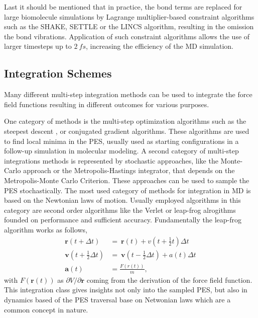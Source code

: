 Last it should be mentioned that in practice, the bond terms are replaced for large biomolecule simulations by Lagrange multiplier-based constraint algorithms such as the SHAKE\cite{Ryckaert1977, Ciccotti1986}, SETTLE\cite{Miyamoto1992} or the LINCS\cite{Hess1997} algorithm, resulting in the omission the bond vibrations. \cite{Ryckaert1977} 
Application of such constraint algorithms allows the use of  larger timesteps up to $2~fs$, increasing the efficiency of the MD simulation. \cite{Cornell1995, Oostenbrink2004}


\subsection{Integration Schemes}
Many different multi-step integration methods can be used to integrate the force field functions resulting in different outcomes for various purposes. 

One category of methods is the multi-step optimization algorithms such as the steepest descent \cite{Debye1909}, or conjugated gradient \cite{Hestenes1952} algorithms. These algorithms are used to find local minima in the PES, usually used as starting configurations in a follow-up simulation in molecular modeling.\cite{Cazals2015}
A second category of multi-step integrations methods is represented by stochastic approaches, like the Monte-Carlo approach or the Metropolis-Hastings integrator\cite{Hastings1970}, that depends on the Metropolis-Monte Carlo Criterion\cite{Metropolis1953}.  These approaches can be used to sample the PES stochastically. 
The most used category of methods for integration in MD is based on the Newtonian laws of motion\cite{Newton1726, Cohen1999}. 
Usually employed algorithms in this category are second order algorithms like the Verlet or leap-frog alrogithms \cite{Hockney1970} founded on performance and sufficient accuracy. \cite{Gunsteren1990}
Fundamentally the leap-frog algorithm works as follows,
\begin{equation}
    \begin{split}
        \textbf{r}(t+\Delta t)&=~\textbf{r}(t)+v(t+\frac{1}{2} t) \Delta t \\
        \textbf{v}(t+\frac{1}{2} \Delta t)&=~\textbf{v}(t - \frac{1}{2} \Delta t)+a(t) \Delta t \\
        \textbf{a}(t)&= \frac{F(r(t))}{m},
    \end{split}
\end{equation}
with $F(\textbf{r}(t))$ as $\partial V/ \partial \textbf{r}$ coming from the derivation of the force field function.\cite{Gunsteren1990}
This integration class gives insights not only into the sampled PES, but also in dynamics based of the PES traversal base on Netwonian laws\cite{Newton1726, Cohen1999} which are a common concept in nature.

